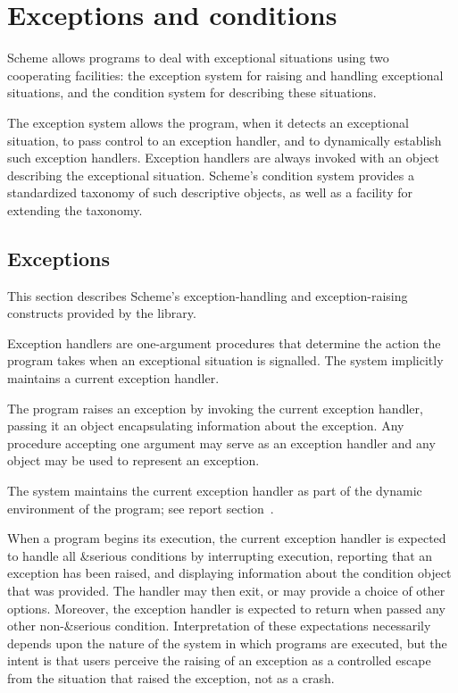 \chapter{Exceptions and conditions}
\label{exceptionsconditionschapter}

Scheme allows programs to deal with exceptional situations using two
cooperating facilities: the exception system for raising and handling
exceptional situations, and the condition system for describing these
situations.

The exception system allows the program, when it detects an
exceptional situation, to pass control to an exception handler, and
to dynamically establish such exception handlers.  Exception
handlers are always invoked with an object describing the exceptional
situation.  Scheme's condition system provides a standardized taxonomy
of such descriptive objects, as well as a facility for extending the
taxonomy.

\section{Exceptions}
\label{exceptionssection}

This section describes Scheme's exception-handling and
exception-raising constructs provided by the  library.

Exception handlers are one-argument procedures that determine the
action the program takes when an exceptional situation is signalled.
The system implicitly maintains a current exception handler.

The program raises an exception
by invoking the current exception handler, passing it an object
encapsulating information about the exception. Any procedure accepting
one argument may serve as an exception handler and any object may be
used to represent an exception.

The system maintains the current exception handler as part of the
dynamic environment of the program; see report
section~.

When a program begins its execution, the current
exception handler is expected to handle all {\cf\&serious}
conditions by interrupting execution, reporting that an
exception has been raised, and displaying information
about the condition object that was provided.  The handler
may then exit, or may provide a choice of other options.
Moreover, the exception handler is expected to return when
passed any other non-{\cf\&serious} condition.
Interpretation of these expectations necessarily depends
upon the nature of the system in which programs are executed,
but the intent is that users perceive the raising of an
exception as a controlled escape from the situation that
raised the exception, not as a crash.

